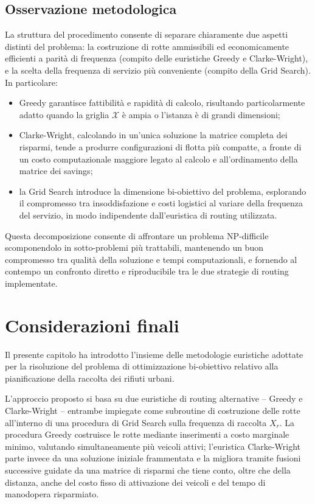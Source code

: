 \subsection*{Osservazione metodologica}

La struttura del procedimento consente di separare chiaramente due aspetti distinti del problema: la costruzione di rotte ammissibili ed economicamente efficienti a parità di frequenza (compito delle euristiche Greedy e Clarke-Wright), e la scelta della frequenza di servizio più conveniente (compito della Grid Search). In particolare:

\begin{itemize}
	\item Greedy garantisce fattibilità e rapidità di calcolo, risultando particolarmente adatto quando la griglia $\mathcal{X}$ è ampia o l'istanza è di grandi dimensioni;
	\item Clarke-Wright, calcolando in un'unica soluzione la matrice completa dei risparmi, tende a produrre configurazioni di flotta più compatte, a fronte di un costo computazionale maggiore legato al calcolo e all'ordinamento della matrice dei savings;
	\item la Grid Search introduce la dimensione bi-obiettivo del problema, esplorando il compromesso tra insoddisfazione e costi logistici al variare della frequenza del servizio, in modo indipendente dall'euristica di routing utilizzata.
\end{itemize}

Questa decomposizione consente di affrontare un problema NP-difficile scomponendolo in sotto-problemi più trattabili, mantenendo un buon compromesso tra qualità della soluzione e tempi computazionali, e fornendo al contempo un confronto diretto e riproducibile tra le due strategie di routing implementate.

\section{Considerazioni finali}

Il presente capitolo ha introdotto l'insieme delle metodologie euristiche adottate per la risoluzione del problema di ottimizzazione bi-obiettivo relativo alla pianificazione della raccolta dei rifiuti urbani.

L'approccio proposto si basa su due euristiche di routing alternative -- Greedy e Clarke-Wright -- entrambe impiegate come subroutine di costruzione delle rotte all'interno di una procedura di Grid Search sulla frequenza di raccolta $X_r$. La procedura Greedy costruisce le rotte mediante inserimenti a costo marginale minimo, valutando simultaneamente più veicoli attivi; l'euristica Clarke-Wright parte invece da una soluzione iniziale frammentata e la migliora tramite fusioni successive guidate da una matrice di risparmi che tiene conto, oltre che della distanza, anche del costo fisso di attivazione dei veicoli e del tempo di manodopera risparmiato.

